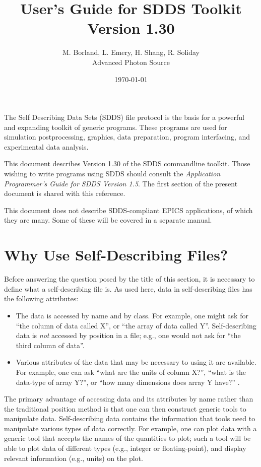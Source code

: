 \documentclass[11pt]{article}
\begin{document}
\title{User's Guide for SDDS Toolkit Version 1.30}
\author{M. Borland, L. Emery, H. Shang, R. Soliday\\Advanced Photon Source\\ \date{\today}}
\maketitle

The Self Describing Data Sets (SDDS) file protocol is the basis for a
powerful and expanding toolkit of generic programs. These
programs are used for simulation postprocessing, graphics, data
preparation, program interfacing, and experimental data analysis.

This document describes Version 1.30 of the SDDS commandline toolkit.
Those wishing to write programs using SDDS should consult the {\em
Application Programmer's Guide for SDDS Version 1.5}\cite{SDDS_AP1.5}.
The first section of the present document is shared with this
reference.

This document does not describe SDDS-compliant EPICS applications, of
which they are many. Some of these will be covered in a separate
manual.

\section{Why Use Self-Describing Files?}

Before answering the question posed by the title of this section, it
is necessary to define what a self-describing file is.  As used here,
data in self-describing files has the following attributes:
\begin{itemize}
\item The data is accessed by name and by class.  For example, one
 might ask for ``the column of data called X'', or ``the array of data
 called Y''.  Self-describing data is {\em not} accessed by position
 in a file; e.g., one would not ask for ``the third column of data''.
\item Various attributes of the data that may be necessary to using it
 are available.  For example, one can ask ``what are the units of
 column X?'', ``what is the data-type of array Y?'', or ``how many
 dimensions does array Y have?'' .
\end{itemize}

The primary advantage of accessing data and its attributes by name
rather than the traditional position method is that one can then
construct generic tools to manipulate data. Self-describing data
contains the information that tools need to manipulate various types
of data correctly.  For example, one can plot data with a generic tool
that accepts the names of the quantities to plot; such a tool will be
able to plot data of different types (e.g., integer or
floating-point), and display relevant information (e.g., units) on the
plot.
\end{document}
